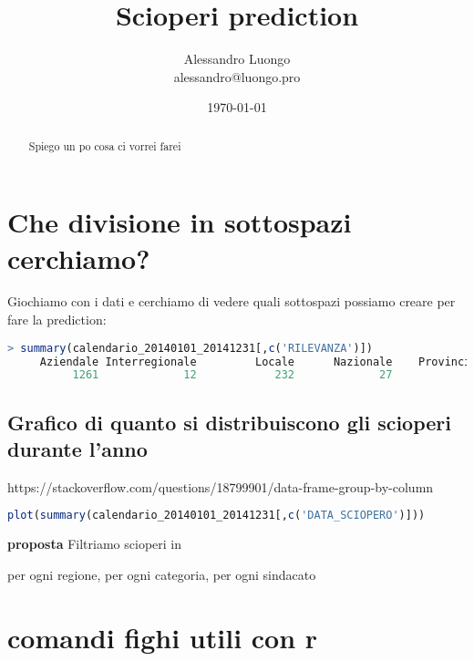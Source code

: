 \documentclass[10pt,a4paper]{article}
\begin{document}
\title{Scioperi prediction}
\author{
        Alessandro Luongo \\
            alessandro@luongo.pro
}
\date{\today}


\setcounter{secnumdepth}{5} 
 

\maketitle
\begin{abstract}
Spiego un po cosa ci vorrei farei
\end{abstract} 

\tableofcontents


\section{Che divisione in sottospazi cerchiamo?}

Giochiamo con i dati e cerchiamo di vedere quali sottospazi possiamo creare per fare la prediction:

\begin{lstlisting}[frame=single,language=R]
> summary(calendario_20140101_20141231[,c('RILEVANZA')])
     Aziendale Interregionale         Locale      Nazionale    Provinciale      Regionale   Territoriale 
          1261             12            232             27             86            207             47 
\end{lstlisting}



\subsection{Grafico di quanto si distribuiscono gli scioperi durante l'anno}
https://stackoverflow.com/questions/18799901/data-frame-group-by-column
\begin{lstlisting}[frame=single,language=R]
plot(summary(calendario_20140101_20141231[,c('DATA_SCIOPERO')]))
\end{lstlisting}


\textbf{proposta}
Filtriamo scioperi in

per ogni regione, per ogni categoria, per ogni sindacato



\section{comandi fighi utili con r}
\end{document}
